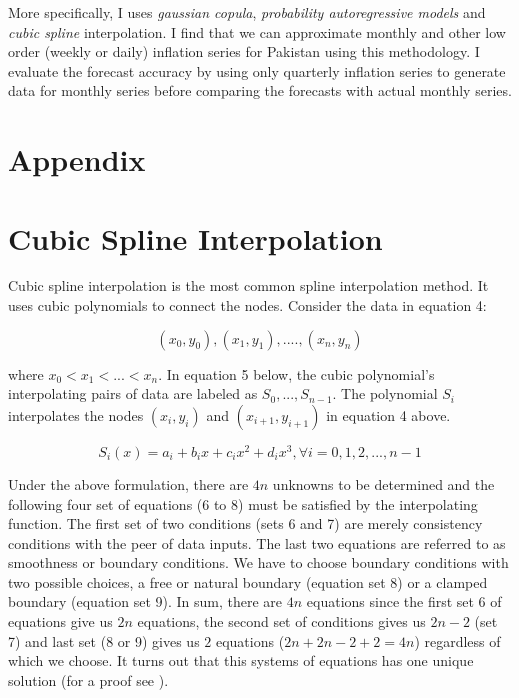 \documentclass[12pt]{article}
\newcommand{\1}{\mathbbm 1}
\begin{document}
		More specifically, I uses \textit{gaussian copula}, \textit{probability autoregressive models} and \textit{cubic spline} interpolation. I find that we can approximate monthly and other low order (weekly or daily) inflation series for Pakistan using this methodology. I evaluate the forecast accuracy by using only quarterly inflation series to generate data for monthly series before comparing the forecasts with actual monthly series.
		
		
		
		
		
		
		
		
		
		
		
		
		
		\newpage
		
		
		
		
		
		
		
		
		
		
		
		
		\section*{Appendix}
		
		
		\section*{Cubic Spline Interpolation}
		
		Cubic spline interpolation is the most common spline interpolation method. It uses cubic polynomials to connect the nodes. Consider the data in equation 4:
		
		\begin{equation}
			(x_{0}, y_{0}), (x_{1}, y_{1}), .... , (x_{n}, y_{n})
		\end{equation}
		
		
		where $x_{0} < x_{1} < ... < x_{n}$. In equation 5 below, the cubic polynomial's interpolating pairs of data are labeled as $S_{0},..., S_{n-1}$. The polynomial $S_{i}$ interpolates the nodes $(x_{i}, y_{i})$ and $(x_{i+1}, y_{i+1})$ in equation 4 above.
		
		
		\begin{equation}
			S_{i}(x) = a_{i} + b_{i}x + c_{i}x^{2} + d_{i}x^{3}, \forall i = 0, 1, 2, ... ,n-1
		\end{equation}
		
		
		Under the above formulation, there are $4n$ unknowns to be determined and the following four set of equations (6 to 8) must be satisfied by the interpolating function. The first set of two conditions (sets 6 and 7) are merely consistency conditions with the peer of data inputs. The last two equations are referred to as smoothness or boundary conditions. We have to choose boundary conditions with two possible choices, a free or natural boundary (equation set 8) or a clamped boundary (equation set 9). In sum, there are $4n$ equations since the first set 6 of equations give us $2n$ equations, the second set of conditions gives us $2n-2$ (set 7) and last set (8 or 9) gives us $2$ equations ($2n + 2n -2 + 2 = 4n$) regardless of which we choose. It turns out that this systems of equations has one unique solution (for a proof see \cite{burden2015numerical}).
		
\end{document}
